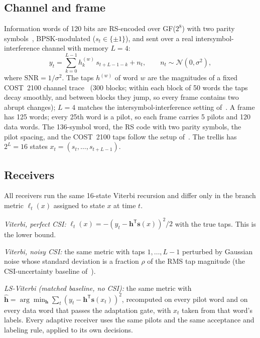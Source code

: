 \documentclass[journal]{IEEEtran}
\begin{document}
\subsection{Channel and frame}
Information words of 120 bits are RS-encoded over GF($2^8$) with two parity symbols~\cite{reed1960polynomial}, BPSK-modulated ($s_t\in\{\pm1\}$), and sent over a real intersymbol-interference channel with memory $L=4$:
\begin{equation}
y_t=\sum_{k=0}^{L-1} h_k^{(w)}\, s_{t+L-1-k}+n_t,\qquad n_t\sim\mathcal{N}(0,\sigma^2),
\end{equation}
where $\mathrm{SNR}=1/\sigma^2$. The taps $h^{(w)}$ of word $w$ are the magnitudes of a fixed COST~2100 channel trace~\cite{liu2012cost2100} (300 blocks; within each block of 50 words the taps decay smoothly, and between blocks they jump, so every frame contains two abrupt changes); $L=4$ matches the intersymbol-interference setting of~\cite{shlezinger2020viterbinet}. A frame has 125 words; every 25th word is a pilot, so each frame carries 5 pilots and 120 data words. The 136-symbol word, the RS code with two parity symbols, the pilot spacing, and the COST~2100 taps follow the setup of~\cite{raviv2021metaviterbinet,raviv2023online}. The trellis has $2^L=16$ states $x_t=(s_t,\dots,s_{t+L-1})$.

\subsection{Receivers}
All receivers run the same 16-state Viterbi recursion and differ only in the branch metric $\ell_t(x)$ assigned to state $x$ at time $t$.

\emph{Viterbi, perfect CSI:} $\ell_t(x)=-(y_t-\mathbf{h}^{\mathsf T}\mathbf{s}(x))^2/2$ with the true taps. This is the lower bound.

\emph{Viterbi, noisy CSI:} the same metric with taps $1,\dots,L-1$ perturbed by Gaussian noise whose standard deviation is a fraction $\rho$ of the RMS tap magnitude (the CSI-uncertainty baseline of~\cite{shlezinger2020viterbinet}).

\emph{LS-Viterbi (matched baseline, no CSI):} the same metric with $\hat{\mathbf{h}}=\arg\min_{\mathbf h}\sum_t(y_t-\mathbf h^{\mathsf T}\mathbf s(x_t))^2$, recomputed on every pilot word and on every data word that passes the adaptation gate, with $x_t$ taken from that word's labels. Every adaptive receiver uses the same pilots and the same acceptance and labeling rule, applied to its own decisions.
\end{document}
